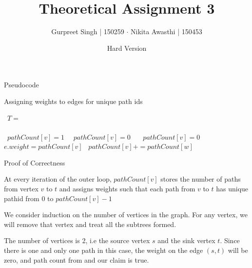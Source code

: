 \documentclass{article}
\title{Theoretical Assignment 3}
\author{Gurpreet Singh | 150259 $\cdot$ Nikita Awasthi | 150453}
\date{Hard Version}
\begin{document}
\maketitle

\begin{question}
    
	\begin{qsection}{Pseudocode}

		\begin{algorithm}[h!]
			\begin{algorithmic}[1]
			\caption{Assigning weights to edges for unique path ids}

													
					\State\ $T = $ 					
					\\\\															
																
								\State\ $pathCount[v] = 1$							
							\Else\
								\State\ $pathCount[v] = 0$
							\EndIf\
						\Else\
							\State\ $pathCount[v] = 0$
								\State\ $e.weight = pathCount[v]$					
								\State\ $pathCount[v] += pathCount[w]$
							\EndFor\
						\EndIf\
					\EndFor\
				\EndProcedure\
			\end{algorithmic}
		\end{algorithm}

	\end{qsection}

	\begin{qsection}{Proof of Correctness}

		\begin{qproof}{At every iteration of the outer loop, $pathCount[v]$ stores the number of paths from vertex $v$ to $t$ and assigns weights such that each path from $v$ to $t$ has unique pathid from 0 to $pathCount[v]-1$}
			
			We consider induction on the number of vertices in the graph. For any vertex, we will remove that vertex and treat all the subtrees formed.\br\

			 The number of vertices is 2, i.e the source vertex $s$ and the sink vertex $t$. Since there is one and only one path in this case, the weight on the edge $(s, t)$ will be zero, and path count from and our claim is true.
			

\end{qproof}
\end{qsection}
\end{question}
\end{document}
